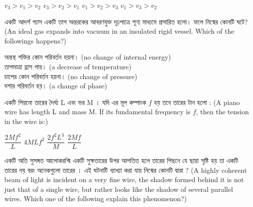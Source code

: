 \documentclass[addpoints]{exam}
\begin{document}
\begin{questions}
\begin{center}
\end{center}

\begin{oneparchoices}
\choice $ v_{3}>v_{1}>v_{2}$
\choice $ v_{3}>v_{2}>v_{1}$
\choice $ v_{1}>v_{2}>v_{3}$
\choice $ v_{1}>v_{3}>v_{2}$
\end{oneparchoices}

\question  একটি আদর্শ গ্যাস একটি তাপ অন্তরকের আবরণযুক্ত দৃঢ়পাত্রে শূণ্য মাধ্যমে প্রসারিত হলো। ফলে নিন্মের কোনটি ঘটে? (An ideal gas expands into vacuum in an insulated rigid vessel. Which of the followings happens?)

\begin{oneparchoices}
\choice অন্তস্থ শক্তির কোন পরিবর্তন হয়না। (no change of internal energy) \\
\hspace*{-.3cm}\choice তাপমাত্রা হ্রাস পায়। (a decrease of temperature)\\ 
\hspace*{-.3cm}\choice চাপের কোন পরিবর্তন হয়না। (no change of pressure)\\
\hspace*{-.3cm}\choice দশার পরিবর্তন হয়। (a change of phase)
\end{oneparchoices}

\question  একটি পিয়নো তারের দৈর্ঘ্য L এবং ভর M । যদি এর মূল কম্পাংক $ f $ হয় তবে তারের টান হলো : (A piano wire has length L and mass M. If its fundamental frequency is $ f $, then the tension in the wire is:)

\begin{oneparchoices}
\choice $ \dfrac{2Mf^{2}}{L} $
\choice $ 4MLf^{2} $
\choice $ \dfrac{2f^{2}L^{3}}{M} $
\choice $ \dfrac{2Mf}{L} $

\end{oneparchoices}


\question  একটি অতি সুসঙ্গত আলোকরশ্মি একটি সুক্ষতারের উপর আপতিত হলে তারের পিছনে যে ছায়া সৃষ্টি হয় তা একটি তারের নয় বরং অনেকগুলো তারের । এই ঘটনাটি ব্যাখ্যা করা যায় নিন্মের কোনটি দ্বারা ? (A highly coherent beam of light is incident on a very fine wire, the shadow formed behind it is not just that of a single wire, but rather looks like the shadow of several parallel wires. Which one of the following explain this phenomenon?)


\end{questions}
\end{document}
